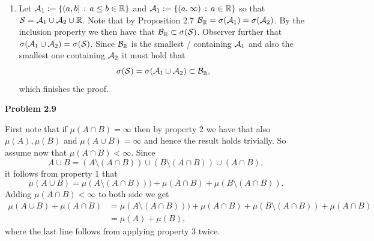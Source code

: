 \begin{enumerate}[label=(\alph*)]
\begin{enumerate}[label=\arabic*.]
Finally suppose that $A = (a.b]$ and $B = (c,\infty)$. Then
\[
	A \setminus B = \begin{cases}
		\emptyset &\text{if } c \le a\\
		(a,c] &\text{if } a \le c \le b\\
		(a,b] &\text{otherwise},
	\end{cases}
\]
which are all in $\cS$. On the other hand
\[
	B \setminus A = \begin{cases}
		(c,a\ \cup (b,\infty) &\text{if } c \le a\\
		(b, \infty) &\text{if } a \le c \le b\\
		(c,\infty) &\text{otherwise},
	\end{cases}
\]
and each is a finite union of elements in $\cS$.
\end{enumerate}
\item Let $\mathcal A_1 := \{(a,b] \, : \, a \le b \in \mathbb R\}$ and $\mathcal A_1 := \{(a,\infty) \, : \, a \in \mathbb R\}$ so that $\mathcal S = \mathcal A_1 \cup \mathcal A_2 \cup \mathbb R$. Note that by Proposition 2.7 $\mathcal B_{\mathbb R} = \sigma(\mathcal A_1) = \sigma(\mathcal A_2)$. By the inclusion property we then have that $\mathcal B_{\mathbb R} \subset \sigma(\mathcal S)$. Observer further that $\sigma(\mathcal A_1 \cup \mathcal A_2) = \sigma(\mathcal S)$. Since $\mathcal B_{\mathbb R}$ is the smallest \sigalg/ containing $\mathcal A_1$ and also the smallest one containing $\mathcal A_2$ it must hold that \[
	\sigma(\mathcal S) = \sigma(\mathcal A_1 \cup \mathcal A_2) \subset \mathcal B_{\mathbb R},
\]
which finishes the proof.
\end{enumerate}

\bigskip

\textbf{Problem 2.9}

First note that if $\mu(A \cap B) = \infty$ then by property 2 we have that also $\mu(A), \mu(B)$ and $\mu(A \cup B) = \infty$ and hence the result holds trivially. So assume now that $\mu(A \cap B) < \infty$. Since 
\[
	A \cup B = (A \setminus (A\cap B)) \cup (B \setminus (A \cap B)) \cup (A \cap B),
\] 
it follows from property 1 that
\[
	\mu(A \cup B) = \mu(A \setminus (A \cap B))) + \mu(A \cap B) + \mu(B \setminus (A \cap B)).
\] 
Adding $\mu(A \cap B) < \infty$ to both side we get
\begin{align*}
	\mu(A \cup B) + \mu(A \cap B) 
	&= \mu(A \setminus (A \cap B))) + \mu(A \cap B) + \mu(B \setminus (A \cap B)) + \mu(A \cap B)\\
	&= \mu(A) + \mu(B), 
\end{align*}
where the last line follows from applying property 3 twice.  
 
\bigskip 

